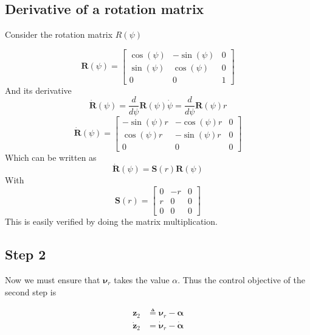 \documentclass[12pt,a4]{article}
\begin{document}
\subsection{Derivative of a rotation matrix}
Consider the rotation matrix $R(\psi)$

\begin{equation}
	\bm{R}(\psi) = \begin{bmatrix} \cos(\psi) & -\sin(\psi) & 0 \\ \sin(\psi) & \cos(\psi) & 0 \\ 0 & 0 & 1 \end{bmatrix}
\end{equation}
And its derivative
\begin{equation}
	\bm{\dot{R}}(\psi) = \dfrac{d}{d\psi} \bm{R}(\psi) \dot{\psi} =  \dfrac{d}{d\psi} \bm{R}(\psi) r
\end{equation}
\begin{equation}
	\bm{\dot{R}}(\psi) = \begin{bmatrix} -\sin(\psi)r & -\cos(\psi)r & 0 \\ \cos(\psi)r & -\sin(\psi)r & 0 \\ 0 & 0 & 0 \end{bmatrix}
\end{equation}
Which can be written as
\begin{equation}
	\bm{\dot{R}}(\psi) = \bm{S}(r)\bm{R}(\psi)
\end{equation}
With
\begin{equation}
	\bm{S}(r) = \begin{bmatrix} 0 & -r & 0 \\ r & 0 & 0 \\ 0 & 0 & 0 \end{bmatrix}
\end{equation}
This is easily verified by doing the matrix multiplication.

\subsection{Step 2}
Now we must ensure that $\bm{\nu}_r$ takes the value $\alpha$. Thus the control objective
of the second step is

\begin{align}
	\bm{z}_2       & \triangleq \bm{\nu}_r - \bm{\alpha}    \\
	\bm{\dot{z}}_2 & = \bm{\dot{\nu}}_r - \bm{\dot{\alpha}}
\end{align}
\end{document}
